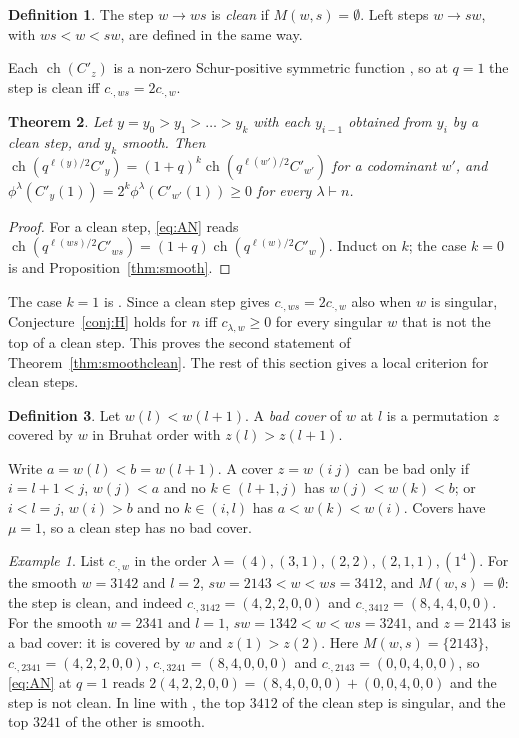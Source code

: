 \documentclass[11pt]{amsart}
\newtheorem{theorem}{Theorem}[section]
\theoremstyle{definition}
\newtheorem{definition}[theorem]{Definition}
\theoremstyle{remark}
\newtheorem{exa}{Example}[section]
\newcommand{\Cp}[1]{C'_{#1}(1)}
\DeclareMathOperator{\ch}{ch}
\begin{document}
\begin{definition}\label{def:clean}
The step $w\to ws$ is \emph{clean} if $M(w,s)=\emptyset$. Left steps $w\to sw$, with $ws<w<sw$, are defined in the same way.
\end{definition}

Each $\ch(C'_z)$ is a non-zero Schur-positive symmetric function \cite[Lemma~1.1]{Hai}, so at $q=1$ the step is clean iff $c_{\cdot,ws}=2c_{\cdot,w}$.

\begin{theorem}\label{thm:clean}
Let $y=y_0>y_1>\dots>y_k$ with each $y_{i-1}$ obtained from $y_i$ by a clean step, and $y_k$ smooth. Then $\ch(q^{\ell(y)/2}C'_y)=(1+q)^k\ch(q^{\ell(w')/2}C'_{w'})$ for a codominant $w'$, and $\phi^\lambda(\Cp y)=2^k\phi^\lambda(\Cp{w'})\ge0$ for every $\lambda\vdash n$.
\end{theorem}

\begin{proof}
For a clean step, \eqref{eq:AN} reads $\ch(q^{\ell(ws)/2}C'_{ws})=(1+q)\ch(q^{\ell(w)/2}C'_w)$. Induct on $k$; the case $k=0$ is \cite[Thm.~1.6]{AN} and Proposition~\ref{thm:smooth}.
\end{proof}

The case $k=1$ is \cite[Thm.~1.7]{AN}. Since a clean step gives $c_{\cdot,ws}=2c_{\cdot,w}$ also when $w$ is singular, Conjecture~\ref{conj:H} holds for $n$ iff $c_{\lambda,w}\ge0$ for every singular $w$ that is not the top of a clean step. This proves the second statement of Theorem~\ref{thm:smoothclean}. The rest of this section gives a local criterion for clean steps.

\begin{definition}\label{def:badcover}
Let $w(l)<w(l+1)$. A \emph{bad cover} of $w$ at $l$ is a permutation $z$ covered by $w$ in Bruhat order with $z(l)>z(l+1)$.
\end{definition}

Write $a=w(l)<b=w(l+1)$. A cover $z=w\,(i\ j)$ can be bad only if $i=l+1<j$, $w(j)<a$ and no $k\in(l+1,j)$ has $w(j)<w(k)<b$; or $i<l=j$, $w(i)>b$ and no $k\in(i,l)$ has $a<w(k)<w(i)$. Covers have $\mu=1$, so a clean step has no bad cover.

\begin{exa}\label{exa:clean}
List $c_{\cdot,w}$ in the order $\lambda=(4),(3,1),(2,2),(2,1,1),(1^4)$. For the smooth $w=3142$ and $l=2$, $sw=2143<w<ws=3412$, and $M(w,s)=\emptyset$: the step is clean, and indeed $c_{\cdot,3142}=(4,2,2,0,0)$ and $c_{\cdot,3412}=(8,4,4,0,0)$. For the smooth $w=2341$ and $l=1$, $sw=1342<w<ws=3241$, and $z=2143$ is a bad cover: it is covered by $w$ and $z(1)>z(2)$. Here $M(w,s)=\{2143\}$, $c_{\cdot,2341}=(4,2,2,0,0)$, $c_{\cdot,3241}=(8,4,0,0,0)$ and $c_{\cdot,2143}=(0,0,4,0,0)$, so \eqref{eq:AN} at $q=1$ reads $2(4,2,2,0,0)=(8,4,0,0,0)+(0,0,4,0,0)$ and the step is not clean. In line with \cite[Prop.~3.1]{AN}, the top $3412$ of the clean step is singular, and the top $3241$ of the other is smooth.
\end{exa}
\end{document}
